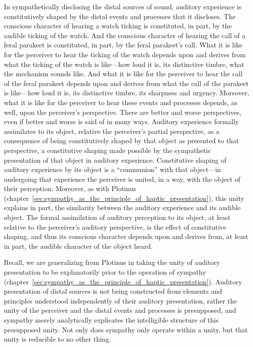 In sympathetically disclosing the distal sources of sound, auditory experience is constitutively shaped by the distal events and processes that it discloses. The conscious character of hearing a watch ticking is constituted, in part, by the audible ticking of the watch. And the conscious character of hearing the call of a feral parakeet is constituted, in part, by the feral parakeet's call. What it is like for the perceiver to hear the ticking of the watch depends upon and derives from what the ticking of the watch is like---how loud it is, its distinctive timbre, what the mechanism sounds like. And what it is like for the perceiver to hear the call of the feral parakeet depends upon and derives from what the call of the parakeet is like---how loud it is, its distinctive timbre, its sharpness and urgency. Moreover, what it is like for the perceiver to hear these events and processes depends, as well, upon the perceiver's perspective. There are better and worse perspectives, even if better and worse is said of in many ways. Auditory experience formally assimilates to its object, relative the perceiver's partial perspective, as a consequence of being constitutively shaped by that object as presented to that perspective, a constitutive shaping made possible by the sympathetic presentation of that object in auditory experience. Constitutive shaping of auditory experience by its object is a ``communion'' with that object---in undergoing that experience the perceiver is united, in a way, with the object of their perception. Moreover, as with Plotinus (chapter~\ref{sec:sympathy_as_the_principle_of_haptic_presentation}), this unity explains in part, the similarity between the auditory experience and its audible object. The formal assimilation of auditory perception to its object, at least relative to the perceiver's auditory perspective, is the effect of constitutive shaping, and thus its conscious character depends upon and derives from, at least in part, the audible character of the object heard.

Recall, we are generalizing from Plotinus in taking the unity of auditory presentation to be explanatorily prior to the operation of sympathy (chapter~\ref{sec:sympathy_as_the_principle_of_haptic_presentation}). Auditory presentation of distal sources is not being constructed from elements and principles understood independently of their auditory presentation, rather the unity of the perceiver and the distal events and processes is presupposed, and sympathy merely analytically explicates the intelligible structure of this presupposed unity. Not only does sympathy only operate within a unity, but that unity is reducible to no other thing.

